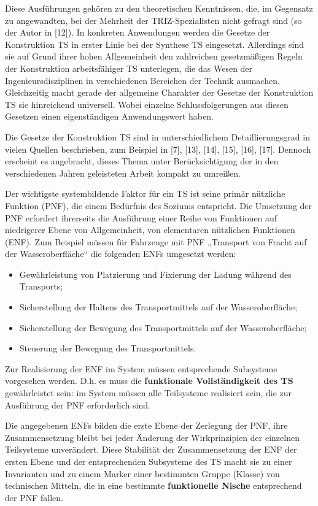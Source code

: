 \documentclass[11pt,a4paper]{article}
\begin{document}
Diese Ausführungen gehören zu den theoretischen Kenntnissen, die, im Gegensatz
zu angewandten, bei der Mehrheit der TRIZ-Spezialisten nicht gefragt sind (so
der Autor in [12]).  In konkreten Anwendungen werden die Gesetze der
Konstruktion TS in erster Linie bei der Synthese TS eingesetzt.  Allerdings
sind sie auf Grund ihrer hohen Allgemeinheit den zahlreichen gesetzmäßigen
Regeln der Konstruktion arbeitsfähiger TS unterlegen, die das Wesen der
Ingenieursdisziplinen in verschiedenen Bereichen der Technik ausmachen.
Gleichzeitig macht gerade der allgemeine Charakter der Gesetze der
Konstruktion TS sie hinreichend universell.  Wobei einzelne Schlussfolgerungen
aus diesen Gesetzen einen eigenständigen Anwendungswert haben.

Die Gesetze der Konstruktion TS sind in unterschiedlichem Detaillierungsgrad
in vielen Quellen beschrieben, zum Beispiel in [7], [13], [14], [15], [16],
[17]. Dennoch erscheint es angebracht, dieses Thema unter Berücksichtigung der
in den verschiedenen Jahren geleisteten Arbeit kompakt zu umreißen.

Der wichtigste systembildende Faktor für ein TS ist seine primär nützliche
Funktion (PNF), die einem Bedürfnis des Soziums entspricht. Die Umsetzung der
PNF erfordert ihrerseits die Ausführung einer Reihe von Funktionen auf
niedrigerer Ebene von Allgemeinheit, von elementaren nützlichen Funktionen
(ENF).  Zum Beispiel müssen für Fahrzeuge mit PNF „Transport von Fracht auf
der Wasseroberfläche“ die folgenden ENFs umgesetzt werden:
\begin{itemize}[noitemsep]
\item Gewährleistung von Platzierung und Fixierung der Ladung während des
  Transports;
\item Sicherstellung der Haltens des Transportmittels auf der
  Wasseroberfläche;
\item Sicherstellung der Bewegung des Transportmittels auf der
  Wasseroberfläche;
\item Steuerung der Bewegung des Transportmittels.
\end{itemize}
Zur Realisierung der ENF im System müssen entsprechende Subsysteme vorgesehen
werden. D.h.  es muss die \textbf{funktionale Vollständigkeit des TS}
gewährleistet sein: im System müssen alle Teilsysteme realisiert sein, die zur
Ausführung der PNF erforderlich sind.

Die angegebenen ENFs bilden die erste Ebene der Zerlegung der PNF, ihre
Zusammensetzung bleibt bei jeder Änderung der Wirkprinzipien der einzelnen
Teilsysteme unverändert. Diese Stabilität der Zusammensetzung der ENF der
ersten Ebene und der entsprechenden Subsysteme des TS macht sie zu einer
Invarianten und zu einem Marker einer bestimmten Gruppe (Klasse) von
technischen Mitteln, die in eine bestimmte \textbf{funktionelle Nische}
entsprechend der PNF fallen.
\end{document}
